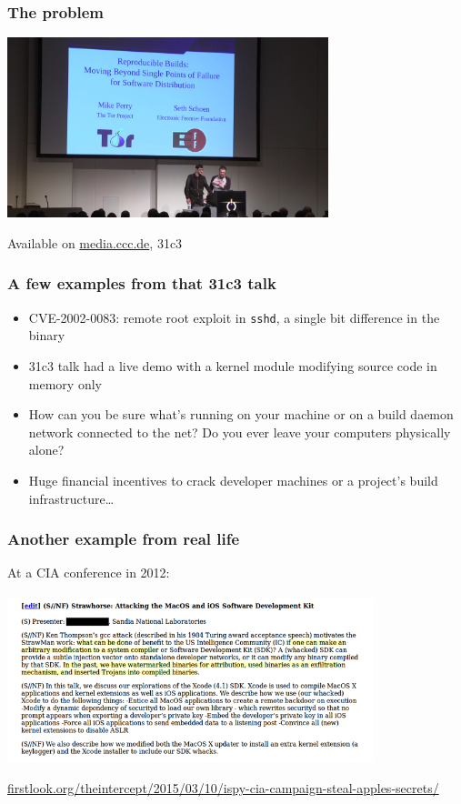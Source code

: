 \documentclass[14pt,aspectratio=169]{beamer}
\begin{document}
\begin{frame}
 \frametitle{The problem}

 \begin{center}
  \includegraphics[width=0.7\textwidth]{images/31c3.png}

  Available on \url{media.ccc.de}, 31c3
 \end{center}
\end{frame}

\begin{frame}[fragile]
 \frametitle{A few examples from that 31c3 talk}
 \begin{itemize}
  \item CVE-2002-0083: remote root exploit in \texttt{sshd}, a single bit difference in the binary
  \item<2-5> 31c3 talk had a live demo with a kernel module modifying source code in memory only
  \item<3-5> How can you be sure what's running on your machine or on a build
  daemon network connected to the net? Do you ever leave your computers physically alone?
  \item<4-5> Huge financial incentives to crack developer machines or a project's
  build infrastructure…
 \end{itemize}
\end{frame}

\begin{frame}[fragile]
 \frametitle{Another example from real life}

 At a CIA conference in 2012:
 \begin{center}
  \includegraphics[width=0.8\textwidth]{images/strawhorse.png}

  {\footnotesize
  \url{firstlook.org/theintercept/2015/03/10/ispy-cia-campaign-steal-apples-secrets/}
  }
 \end{center}
\end{frame}
\end{document}
